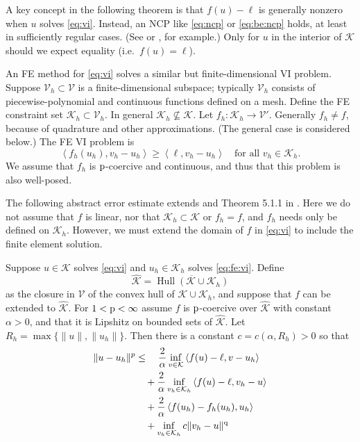 \documentclass[hidelinks,onefignum,onetabnum,final]{siamart220329}  %
\newcommand{\cK}{\mathcal{K}}
\newcommand{\cV}{\mathcal{V}}
\newcommand{\hcK}{\widehat{\cK}}
\newcommand{\pp}{{\text{\textnormal{p}}}}
\newcommand{\qq}{{\text{\textnormal{q}}}}
\newcommand{\ip}[2]{\left<#1,#2\right>}
\DeclareMathOperator*{\Hull}{Hull}
\begin{document}
A key concept in the following theorem is that $f(u)-\ell$ is generally nonzero when $u$ solves \eqref{eq:vi}.  Instead, an NCP like \eqref{eq:ncp} or \eqref{eq:be:ncp} holds, at least in sufficiently regular cases.  (See \cite[Exercise 5.1.1]{Ciarlet2002} or \cite[section 7]{BuelerFarrell2024}, for example.)  Only for $u$ in the interior of $\cK$ should we expect equality (i.e.~$f(u)=\ell$).

An FE method for \eqref{eq:vi} solves a similar but finite-dimensional VI problem.  Suppose $\cV_h \subset \cV$ is a finite-dimensional subspace; typically $\cV_h$ consists of piecewise-polynomial and continuous functions defined on a mesh.  Define the FE constraint set $\cK_h\subset \cV_h$.  In general $\cK_h \nsubseteq \cK$.  Let $f_h:\cK_h\to\cV'$.  Generally $f_h\ne f$, because of quadrature and other approximations.  (The general case is considered below.)  The FE VI problem is
\begin{equation}
\ip{f_h(u_h)}{v_h-u_h} \ge \ip{\ell}{v_h-u_h} \quad \text{for all } v_h\in \cK_h. \label{eq:fe:vi}
\end{equation}
We assume that $f_h$ is $\pp$-coercive and continuous, and thus that this problem is also well-posed.

The following abstract error estimate extends \cite{Falk1974} and Theorem 5.1.1 in \cite{Ciarlet2002}.  Here we do not assume that $f$ is linear, nor that $\cK_h \subset \cK$ or $f_h=f$, and $f_h$ needs only be defined on $\cK_h$.  However, we must extend the domain of $f$ in \eqref{eq:vi} to include the finite element solution.

\begin{theorem} \label{thm:abstractestimate}  Suppose $u\in\cK$ solves \eqref{eq:vi} and $u_h\in\cK_h$ solves \eqref{eq:fe:vi}.  Define
\begin{equation}
\hcK = \overline{\Hull{(\cK \cup \cK_h)}}  \label{eq:convexhull}
\end{equation}
as the closure in $\cV$ of the convex hull of $\cK \cup \cK_h$, and suppose that $f$ can be extended to $\hcK$.  For $1<\pp<\infty$ assume $f$ is $\pp$-coercive over $\hcK$ with constant $\alpha>0$, and that it is Lipshitz on bounded sets of $\hcK$.  Let $R_h=\max\{\|u\|,\|u_h\|\}$.  Then there is a constant $c=c(\alpha,R_h)>0$ so that
\begin{align}
\|u-u_h\|^p &\le \quad \frac{2}{\alpha} \inf_{v\in\cK} \ip{f(u)-\ell}{v-u_h} \label{eq:abstractestimate} \\
   &\quad + \frac{2}{\alpha} \inf_{v_h\in\cK_h} \ip{f(u)-\ell}{v_h-u} \notag \\
   &\quad + \frac{2}{\alpha} \ip{f(u_h)-f_h(u_h)}{u_h} \notag \\
   &\quad + \inf_{v_h\in\cK_h} c \|v_h - u\|^\qq \notag
\end{align}
\end{theorem}
\end{document}
